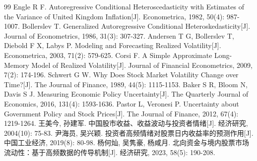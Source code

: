 \documentclass[12pt,a4paper,fontset=fandol]{ctexart}
\begin{document}
\newpage
\begin{thebibliography}{99}
 Engle R F. Autoregressive Conditional Heteroscedasticity with Estimates of the Variance of United Kingdom Inflation[J]. Econometrica, 1982, 50(4): 987-1007.
 Bollerslev T. Generalized Autoregressive Conditional Heteroskedasticity[J]. Journal of Econometrics, 1986, 31(3): 307-327.
 Andersen T G, Bollerslev T, Diebold F X, Labys P. Modeling and Forecasting Realized Volatility[J]. Econometrica, 2003, 71(2): 579-625.
 Corsi F. A Simple Approximate Long-Memory Model of Realized Volatility[J]. Journal of Financial Econometrics, 2009, 7(2): 174-196.
 Schwert G W. Why Does Stock Market Volatility Change over Time?[J]. The Journal of Finance, 1989, 44(5): 1115-1153.
 Baker S R, Bloom N, Davis S J. Measuring Economic Policy Uncertainty[J]. The Quarterly Journal of Economics, 2016, 131(4): 1593-1636.
 Pastor L, Veronesi P. Uncertainty about Government Policy and Stock Prices[J]. The Journal of Finance, 2012, 67(4): 1219-1264.
 王美今, 孙建军. 中国股市收益、收益波动与投资者情绪[J]. 经济研究, 2004(10): 75-83.
 尹海员, 吴兴颖. 投资者高频情绪对股票日内收益率的预测作用[J]. 中国工业经济, 2019(8): 80-98.
 杨何灿, 吴隽豪, 杨咸月. 北向资金与境内股票市场流动性：基于高频数据的传导机制[J]. 经济研究, 2023, 58(5): 190-208.
\end{thebibliography}
\end{document}

